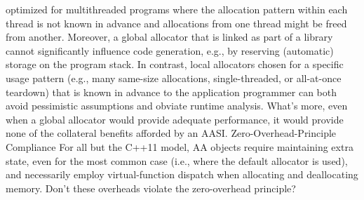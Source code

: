 optimized for multithreaded programs where the allocation pattern within each
thread is not known in advance and allocations from one thread might be freed from
another. Moreover, a global allocator that is linked as part of a library cannot
significantly influence code generation, e.g., by reserving (automatic) storage on the
program stack. In contrast, local allocators chosen for a specific usage pattern (e.g.,
many same-size allocations, single-threaded, or all-at-once teardown) that is known
in advance to the application programmer can both avoid pessimistic assumptions
and obviate runtime analysis. What’s more, even when a global allocator would
provide adequate performance, it would provide none of the collateral benefits
afforded by an AASI.
Zero-Overhead-Principle Compliance
For all but the C++11 model, AA objects require maintaining extra state, even for the
most common case (i.e., where the default allocator is used), and necessarily employ
virtual-function dispatch when allocating and deallocating memory. Don’t these
overheads violate the zero-overhead principle?

